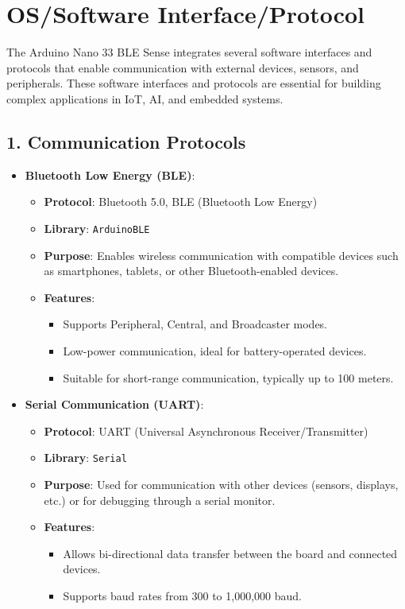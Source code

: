 \section{OS/Software Interface/Protocol}
	The Arduino Nano 33 BLE Sense integrates several software interfaces and protocols that enable communication with external devices, sensors, and peripherals. These software interfaces and protocols are essential for building complex applications in IoT, AI, and embedded systems.
	
	\subsection*{1. Communication Protocols}
	
	\begin{itemize}
		\item \textbf{Bluetooth Low Energy (BLE)}:
		\begin{itemize}
			\item \textbf{Protocol}: Bluetooth 5.0, BLE (Bluetooth Low Energy)
			\item \textbf{Library}: \texttt{ArduinoBLE}
			\item \textbf{Purpose}: Enables wireless communication with compatible devices such as smartphones, tablets, or other Bluetooth-enabled devices.
			\item \textbf{Features}:
			\begin{itemize}
				\item Supports Peripheral, Central, and Broadcaster modes.
				\item Low-power communication, ideal for battery-operated devices.
				\item Suitable for short-range communication, typically up to 100 meters.
			\end{itemize}
		\end{itemize}
		
		\item \textbf{Serial Communication (UART)}:
		\begin{itemize}
			\item \textbf{Protocol}: UART (Universal Asynchronous Receiver/Transmitter)
			\item \textbf{Library}: \texttt{Serial}
			\item \textbf{Purpose}: Used for communication with other devices (sensors, displays, etc.) or for debugging through a serial monitor.
			\item \textbf{Features}:
			\begin{itemize}
				\item Allows bi-directional data transfer between the board and connected devices.
				\item Supports baud rates from 300 to 1,000,000 baud.
			\end{itemize}
		\end{itemize}
		

\end{itemize}
